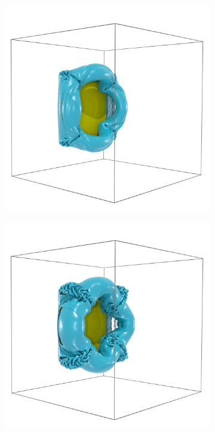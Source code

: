 \documentclass[preprint,12pt]{elsarticle}
\begin{document}
\begin{figure}
\begin{subfigure}{.33\textwidth}
    \end{subfigure}%
    \begin{subfigure}{.33\textwidth}
        \centering
        \includegraphics[width=\textwidth]{tex/fig/disk_high_re_4.png}
    \end{subfigure}
    \begin{subfigure}{.33\textwidth}
        \centering
        \includegraphics[width=\textwidth]{tex/fig/disk_high_re_5.png}

\end{subfigure}
\end{figure}
\end{document}
